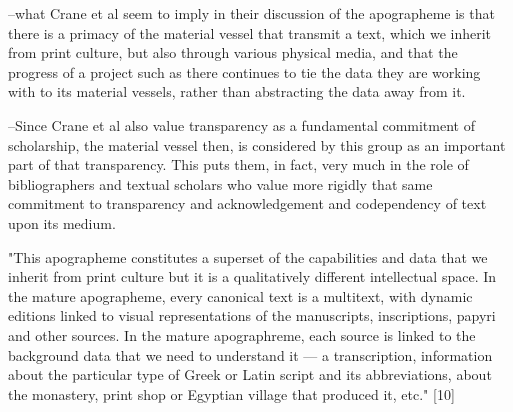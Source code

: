 \documentclass[course, english]{Notes}
\begin{document}
 --{what Crane et al seem to imply in their discussion of the apographeme is that there is a primacy of the material vessel that transmit a text, which we inherit from print culture, but also through various physical media, and that the progress of a project such as there continues to tie the data they are working with to its material vessels, rather than abstracting the data away from it.}

 --{Since Crane et al also value transparency as a fundamental commitment of scholarship, the material vessel then, is considered by this group as an important part of that transparency. This puts them, in fact, very much in the role of bibliographers and textual scholars who value more rigidly that same commitment to transparency and acknowledgement and codependency of text upon its medium.}

"This apographeme constitutes a superset of the capabilities and data that we inherit from print culture but it is a qualitatively different intellectual space. In the mature apographeme, every canonical text is a multitext, with dynamic editions linked to visual representations of the manuscripts, inscriptions, papyri and other sources. In the mature apographreme, each source is linked to the background data that we need to understand it — a transcription, information about the particular type of Greek or Latin script and its abbreviations, about the monastery, print shop or Egyptian village that produced it, etc." [10]
\end{document}
